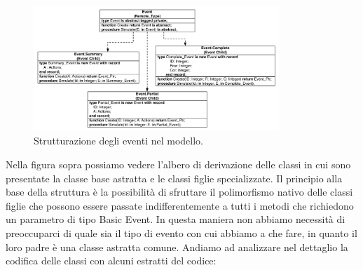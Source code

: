 \documentclass[aps,letterpaper,10pt]{article}
\begin{document}
\begin{figure}[H]
	\begin{center}
		\includegraphics[width=350px]{images/event-struct.pdf}
	\end{center}
\caption{Strutturazione degli eventi nel modello.}
\end{figure}

Nella figura sopra possiamo vedere l'albero di derivazione delle classi in cui sono presentate la classe base astratta e
le classi figlie specializzate. Il principio alla base della struttura \`e la possibilit\`a di sfruttare il polimorfismo
nativo delle classi figlie che possono essere passate indifferentemente a tutti i metodi che richiedono un parametro di
tipo Basic Event. In questa maniera non abbiamo necessit\`a di preoccuparci di quale sia il tipo di evento con cui
abbiamo a che fare, in quanto il loro padre \`e una classe astratta comune. Andiamo ad analizzare nel dettaglio la
codifica delle classi con alcuni estratti del codice:
\end{document}
